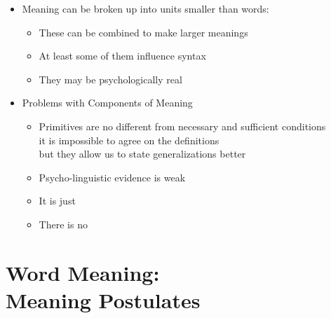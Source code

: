 \documentclass[headrule,footrule]{foils}
\begin{document}
\begin{itemize}
\item Meaning can be broken up into units smaller than words:   
  \begin{itemize}
  \item These can be combined to make larger meanings
  \item At least some of them influence syntax
  \item They may be psychologically real
  \end{itemize}
\item Problems with Components of Meaning
  \begin{itemize}
  \item Primitives are no different from necessary and sufficient conditions
    \\ it is impossible to agree on the definitions
    \\ but they allow us to state generalizations better
  \item Psycho-linguistic evidence is weak
  \item It is just 
  \item There is no 
  \end{itemize}
\end{itemize}



\section{Word Meaning: \\ Meaning Postulates}
\end{document}
